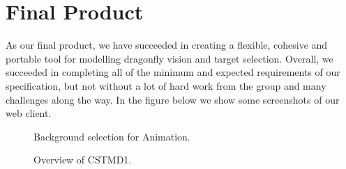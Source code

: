 \documentclass[a4paper,11pt]{article}
\begin{document}
\clearpage
\section{Final Product}

As our final product, we have succeeded in creating a flexible, cohesive and portable tool for modelling dragonfly vision and target selection. Overall, we succeeded in completing all of the minimum and expected requirements of our specification, but not without a lot of hard work from the group and many challenges along the way. In the figure below we show some screenshots of our web client.

\begin{figure}[H]
\begin{minipage}{0.5\textwidth}
\centering
{}
\caption{Background selection for Animation.\\}
\end{minipage}
\begin{minipage}{0.5\textwidth}
\centering
{}
\caption{Overview of CSTMD1.}
\end{minipage}


\end{figure}
\end{document}
